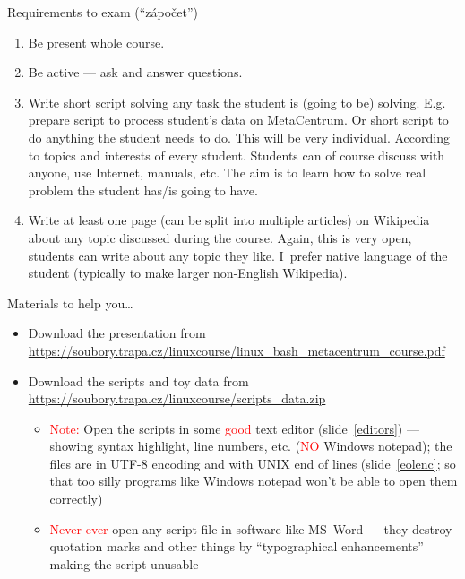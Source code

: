 \documentclass[compress, xelatex, 11pt, xcolor=svgnames, aspectratio=169,
	hyperref={
		bookmarks=true,
		unicode=true,
		colorlinks=true,
		pdftitle={Linux, command line and MetaCentrum},
		plainpages=false,
		pdfauthor={Vojtech Zeisek},
		pdfsubject={Course about use of Linux command line, writing shell scripts and using MetaCentrum of CESNET},
		pdfcreator={XeLaTeX},
		pdfkeywords={Linux, GNU, BASH, shell, command line, MetaCentrum},
		linkcolor=DarkRed, %
		anchorcolor=DarkBlue, %
		citecolor=Indigo, %
		filecolor=NavyBlue, %
		menucolor=DarkMagenta, %
		urlcolor=DarkBlue, %
		},
	url={hyphens, lowtilde} %
	]{beamer}
\renewcommand{\alert}[1]{\textcolor{red}{#1}}
\begin{document}
\begin{frame}{Requirements to exam (\enquote{zápočet})}
	\begin{enumerate}
		\item Be present whole course.
		\item Be active --- ask and answer questions.
		\item Write short script solving any task the student is (going to be) solving. E.g. prepare script to process student's data on MetaCentrum. Or short script to do anything the student needs to do. This will be very individual. According to topics and interests of every student. Students can of course discuss with anyone, use Internet, manuals, etc. The aim is to learn how to solve real problem the student has/is going to have.
		\item Write at least one page (can be split into multiple articles) on Wikipedia about any topic discussed during the course. Again, this is very open, students can write about any topic they like. I~prefer native language of the student (typically to make larger non-English Wikipedia).
	\end{enumerate}
\end{frame}

\begin{frame}{Materials to help you\ldots}
	\label{materials}
	\begin{itemize}
		\item Download the presentation from \url{https://soubory.trapa.cz/linuxcourse/linux_bash_metacentrum_course.pdf}
		\item Download the scripts and toy data from \url{https://soubory.trapa.cz/linuxcourse/scripts_data.zip}
		\begin{itemize}
			\item \alert{Note:} Open the scripts in some \alert{good} text editor (slide~\ref{editors}) --- showing syntax highlight, line numbers, etc. (\alert{NO} Windows notepad); the files are in UTF-8 encoding and with UNIX end of lines (slide~\ref{eolenc}; so that too silly programs like Windows notepad won't be able to open them correctly)
			\item \alert{Never ever} open any script file in software like MS~Word --- they destroy quotation marks and other things by \enquote{typographical enhancements} making the script unusable
		\end{itemize}
	\end{itemize}
\end{frame}
\end{document}

